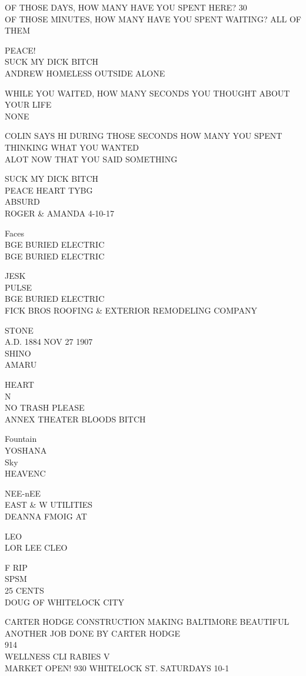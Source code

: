 \documentclass[10pt,letterpaper]{article}
\begin{document}
OF THOSE DAYS, HOW MANY HAVE YOU SPENT HERE?  30\\
OF THOSE MINUTES, HOW MANY HAVE YOU SPENT WAITING?  ALL OF THEM

PEACE!\\
SUCK MY DICK BITCH\\
ANDREW HOMELESS OUTSIDE ALONE

WHILE YOU WAITED, HOW MANY SECONDS YOU THOUGHT ABOUT YOUR LIFE\\
NONE

COLIN SAYS HI DURING THOSE SECONDS HOW MANY YOU SPENT THINKING WHAT YOU WANTED\\
ALOT NOW THAT YOU SAID SOMETHING

SUCK MY DICK BITCH\\
PEACE HEART TYBG\\
ABSURD\\
ROGER \& AMANDA 4{-}10{-}17

Faces\\
BGE BURIED ELECTRIC\\
BGE BURIED ELECTRIC

JESK\\
PULSE\\
BGE BURIED ELECTRIC\\
FICK BROS ROOFING \& EXTERIOR REMODELING COMPANY

STONE\\
A.D. 1884 NOV 27 1907\\
SHINO\\
AMARU

HEART\\
N\\
NO TRASH PLEASE\\
ANNEX THEATER BLOODS BITCH

Fountain\\
YOSHANA\\
Sky\\
HEAVENC

NEE{-}nEE\\
EAST \& W UTILITIES\\
DEANNA FMOIG AT

LEO\\
LOR LEE CLEO

F RIP\\
SPSM\\
25 CENTS\\
DOUG OF WHITELOCK CITY

CARTER HODGE CONSTRUCTION MAKING BALTIMORE BEAUTIFUL ANOTHER JOB DONE BY CARTER HODGE\\
914\\
WELLNESS CLI RABIES V\\
MARKET OPEN! 930 WHITELOCK ST. SATURDAYS 10{-}1
\end{document}
